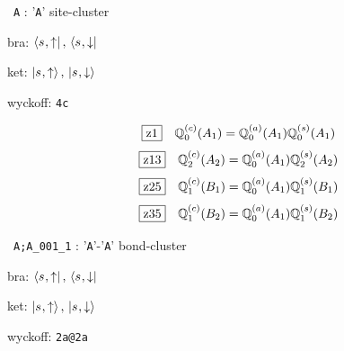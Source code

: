 \documentclass[fleqn,10pt,landscape]{jsarticle}
\begin{document}
\vspace{5mm}

\noindent\textbullet\, \texttt{A} : '\texttt{A}' site-cluster

\noindent\quad * bra: $\bra{s_{},\uparrow},\, \bra{s_{},\downarrow}$

\noindent\quad * ket: $\ket{s_{},\uparrow},\, \ket{s_{},\downarrow}$

\noindent\quad * wyckoff: \texttt{4c}

\begin{dmath*}
\hspace*{3mm}\fbox{z1}\quad \mathbb{Q}_{0}^{(c)}(A_{1})=\mathbb{Q}_{0}^{(a)}(A_{1}) \mathbb{Q}_{0}^{(s)}(A_{1})
\end{dmath*}
\begin{dmath*}
\hspace*{3mm}\fbox{z13}\quad \mathbb{Q}_{2}^{(c)}(A_{2})=\mathbb{Q}_{0}^{(a)}(A_{1}) \mathbb{Q}_{2}^{(s)}(A_{2})
\end{dmath*}
\begin{dmath*}
\hspace*{3mm}\fbox{z25}\quad \mathbb{Q}_{1}^{(c)}(B_{1})=\mathbb{Q}_{0}^{(a)}(A_{1}) \mathbb{Q}_{1}^{(s)}(B_{1})
\end{dmath*}
\begin{dmath*}
\hspace*{3mm}\fbox{z35}\quad \mathbb{Q}_{1}^{(c)}(B_{2})=\mathbb{Q}_{0}^{(a)}(A_{1}) \mathbb{Q}_{1}^{(s)}(B_{2})
\end{dmath*}
\vspace{5mm}

\noindent\textbullet\, \texttt{A;A_001_1} : '\texttt{A}'-'\texttt{A}' bond-cluster

\noindent\quad * bra: $\bra{s_{},\uparrow},\, \bra{s_{},\downarrow}$

\noindent\quad * ket: $\ket{s_{},\uparrow},\, \ket{s_{},\downarrow}$

\noindent\quad * wyckoff: \texttt{2a@2a}
\end{document}

